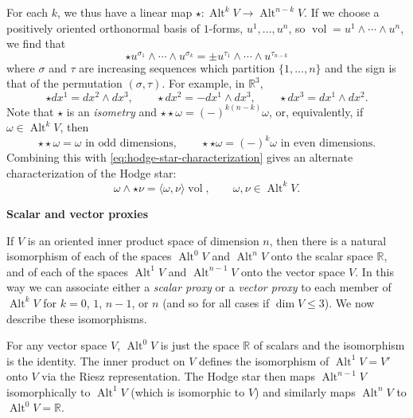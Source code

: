 {For each $k$, we thus have a linear map $\star:\operatorname{Alt}^kV\to\operatorname{Alt}^{n-k}V$. If we choose a positively oriented orthonormal basis of $1$-forms, $u^1,\ldots,u^n$, so $\operatorname{vol}=u^1\wedge\cdots\wedge u^n$, we find that}
\[
\star u^{\sigma_1}\wedge\cdots\wedge u^{\sigma_k}=\pm u^{\tau_1}\wedge\cdots\wedge u^{\tau_{n-k}}
\]
{where $\sigma$ and $\tau$ are increasing sequences which partition $\{1,\ldots,n\}$ and the sign is that of the permutation $(\sigma,\tau)$. For example, in $\mathbb R^3$,}
\[
\star dx^1=dx^2\wedge dx^3,\qquad\star dx^2=-dx^1\wedge dx^3,\qquad\star dx^3=dx^1\wedge dx^2.
\]
{Note that $\star$ is an \emph{isometry} and $\star\star\omega=(-)^{k(n-k)}\omega$, or, equivalently, if $\omega\in\operatorname{Alt}^kV$, then}
\[
\star\star\omega=\omega\text{ in odd dimensions},\qquad\star\star\omega=(-)^k\omega\text{ in even dimensions}.
\]
{Combining this with \eqref{eq:hodge-star-characterization} gives an alternate characterization of the Hodge star:}
\begin{equation}\label{eq:hodge-star-inner-product}
\omega\wedge\star\nu=\langle\omega,\nu\rangle\operatorname{vol},\qquad\omega,\nu\in\operatorname{Alt}^kV.
\end{equation}

\medskip\noindent\textbf{{Scalar and vector proxies}}\par
{If $V$ is an oriented inner product space of dimension $n$, then there is a natural isomorphism of each of the spaces $\operatorname{Alt}^0V$ and $\operatorname{Alt}^nV$ onto the scalar space $\mathbb R$, and of each of the spaces $\operatorname{Alt}^1V$ and $\operatorname{Alt}^{n-1}V$ onto the vector space $V$. In this way we can associate either a \emph{scalar proxy} or a \emph{vector proxy} to each member of $\operatorname{Alt}^kV$ for $k=0$, $1$, $n-1$, or $n$ (and so for all cases if $\dim V\leq3$). We now describe these isomorphisms.}

{For any vector space $V$, $\operatorname{Alt}^0V$ is just the space $\mathbb R$ of scalars and the isomorphism is the identity. The inner product on $V$ defines the isomorphism of $\operatorname{Alt}^1V=V'$ onto $V$ via the Riesz representation. The Hodge star then maps $\operatorname{Alt}^{n-1}V$ isomorphically to $\operatorname{Alt}^1V$ (which is isomorphic to $V$) and similarly maps $\operatorname{Alt}^nV$ to $\operatorname{Alt}^0V=\mathbb R$.}

